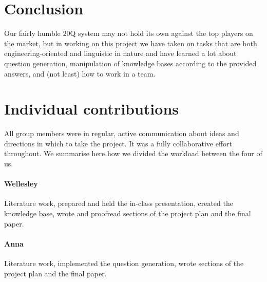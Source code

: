 \documentclass[11pt,a4paper]{article}
\begin{document}

\section{Conclusion}
\label{sec:concl}

Our fairly humble 20Q system may not hold its own against the top players on the market, but in working on this project we have taken on tasks that are both engineering-oriented and linguistic in nature and have learned a lot about question generation, manipulation of knowledge bases according to the provided answers, and (not least) how to work in a team. 





\appendix

\section{Individual contributions}
\label{app:contributions}

All group members were in regular, active communication about ideas and directions in which to take the project.
It was a fully collaborative effort throughout.
We summarise here how we divided the workload between the four of us.

\paragraph{Wellesley} Literature work, prepared and held the in-class presentation, created the knowledge base, wrote and proofread sections of the project plan and the final paper.

\paragraph{Anna} Literature work, implemented the question generation, wrote sections of the project plan and the final paper.
\end{document}
